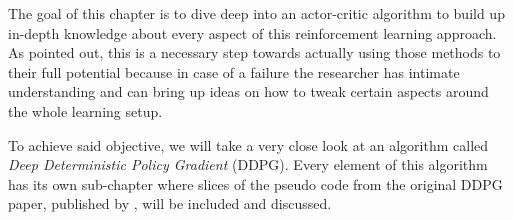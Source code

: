 The goal of this chapter is to dive deep into an actor-critic algorithm to build up in-depth knowledge about every aspect of this reinforcement learning approach. As \cite{tim2018} pointed out, this is a necessary step towards actually using those methods to their full potential because in case of a failure the researcher has intimate understanding and can bring up ideas on how to tweak certain aspects around the whole learning setup.
\par
To achieve said objective, we will take a very close look at an algorithm called \textit{Deep Deterministic Policy Gradient} (DDPG). Every element of this algorithm has its own sub-chapter where slices of the pseudo code from the original DDPG paper, published by \cite{lillicrap2019continuous}, will be included and discussed.

